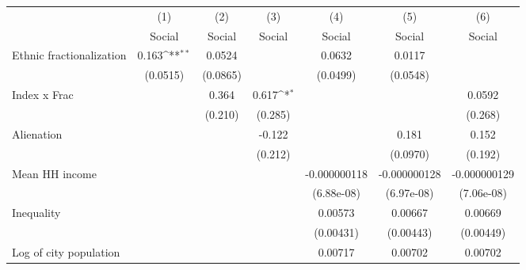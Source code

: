 {
\def\sym#1{\ifmmode^{#1}\else\(^{#1}\)\fi}
\begin{tabular}{l*{6}{c}}
\hline\hline
                    &\multicolumn{1}{c}{(1)}&\multicolumn{1}{c}{(2)}&\multicolumn{1}{c}{(3)}&\multicolumn{1}{c}{(4)}&\multicolumn{1}{c}{(5)}&\multicolumn{1}{c}{(6)}\\
                    &\multicolumn{1}{c}{Social}&\multicolumn{1}{c}{Social}&\multicolumn{1}{c}{Social}&\multicolumn{1}{c}{Social}&\multicolumn{1}{c}{Social }&\multicolumn{1}{c}{Social}\\
\hline
Ethnic fractionalization&       0.163\sym{**} &      0.0524         &                     &      0.0632         &      0.0117         &                     \\
                    &    (0.0515)         &    (0.0865)         &                     &    (0.0499)         &    (0.0548)         &                     \\
[1em]
Index x Frac        &                     &       0.364         &       0.617\sym{*}  &                     &                     &      0.0592         \\
                    &                     &     (0.210)         &     (0.285)         &                     &                     &     (0.268)         \\
[1em]
Alienation          &                     &                     &      -0.122         &                     &       0.181         &       0.152         \\
                    &                     &                     &     (0.212)         &                     &    (0.0970)         &     (0.192)         \\
[1em]
Mean HH income      &                     &                     &                     &-0.000000118         &-0.000000128         &-0.000000129         \\
                    &                     &                     &                     &  (6.88e-08)         &  (6.97e-08)         &  (7.06e-08)         \\
[1em]
Inequality          &                     &                     &                     &     0.00573         &     0.00667         &     0.00669         \\
                    &                     &                     &                     &   (0.00431)         &   (0.00443)         &   (0.00449)         \\
[1em]
Log of city population&                     &                     &                     &     0.00717         &     0.00702         &     0.00702         \\

\end{tabular}}
